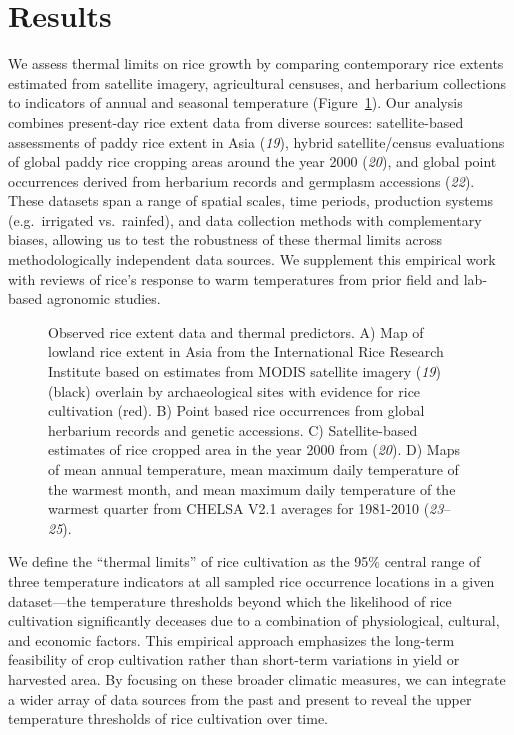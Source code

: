 \documentclass[
  letterpaper,
  DIV=11,
  numbers=noendperiod]{scrartcl}
\makeatletter
\newcommand*\pandocbounded[1]{%
  \sbox\pandoc@box{#1}%
  \Gscale@div\@tempa{\textheight}{\dimexpr\ht\pandoc@box+\dp\pandoc@box\relax}%
  \Gscale@div\@tempb{\linewidth}{\wd\pandoc@box}%
  \ifdim\@tempb\p@<\@tempa\p@\let\@tempa\@tempb\fi%
  \ifdim\@tempa\p@<\p@\scalebox{\@tempa}{\usebox\pandoc@box}%
  \else\usebox{\pandoc@box}%
  \fi%
}
\makeatother
\begin{document}
\section{Results}\label{results}

We assess thermal limits on rice growth by comparing contemporary rice
extents estimated from satellite imagery, agricultural censuses, and
herbarium collections to indicators of annual and seasonal temperature
(Figure~\ref{fig-overview}). Our analysis combines present-day rice
extent data from diverse sources: satellite-based assessments of paddy
rice extent in Asia (\emph{19}), hybrid satellite/census evaluations of
global paddy rice cropping areas around the year 2000 (\emph{20}), and
global point occurrences derived from herbarium records and germplasm
accessions (\emph{22}). These datasets span a range of spatial scales,
time periods, production systems (e.g.~irrigated vs.~rainfed), and data
collection methods with complementary biases, allowing us to test the
robustness of these thermal limits across methodologically independent
data sources. We supplement this empirical work with reviews of rice's
response to warm temperatures from prior field and lab-based agronomic
studies.

\label{cell-fig-overview}
\begin{figure}[H]

\centering{

\pandocbounded{\texttt{[image: main\_files/figure-pdf/fig-overview-1.pdf]}}

}

\caption{\label{fig-overview}Observed rice extent data and thermal
predictors. A) Map of lowland rice extent in Asia from the International
Rice Research Institute based on estimates from MODIS satellite imagery
(\emph{19}) (black) overlain by archaeological sites with evidence for
rice cultivation (red). B) Point based rice occurrences from global
herbarium records and genetic accessions. C) Satellite-based estimates
of rice cropped area in the year 2000 from (\emph{20}). D) Maps of mean
annual temperature, mean maximum daily temperature of the warmest month,
and mean maximum daily temperature of the warmest quarter from CHELSA
V2.1 averages for 1981-2010 (\emph{23}--\emph{25}).}

\end{figure}%

We define the ``thermal limits'' of rice cultivation as the 95\% central
range of three temperature indicators at all sampled rice occurrence
locations in a given dataset---the temperature thresholds beyond which
the likelihood of rice cultivation significantly deceases due to a
combination of physiological, cultural, and economic factors. This
empirical approach emphasizes the long-term feasibility of crop
cultivation rather than short-term variations in yield or harvested
area. By focusing on these broader climatic measures, we can integrate a
wider array of data sources from the past and present to reveal the
upper temperature thresholds of rice cultivation over time.
\end{document}
